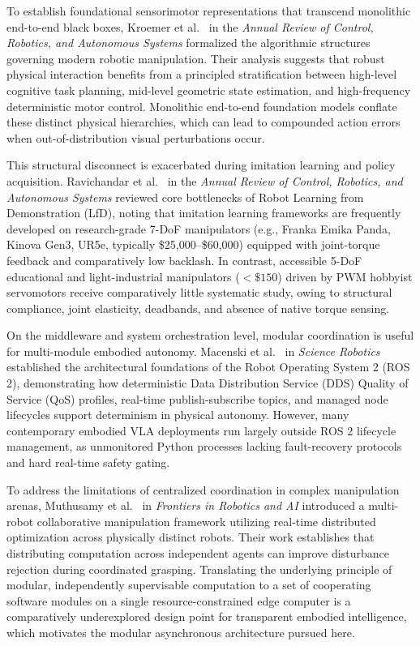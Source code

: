 \documentclass[journal]{IEEEtran}
\begin{document}
To establish foundational sensorimotor representations that transcend monolithic end-to-end black boxes, Kroemer et al.~\cite{kroemer2021review} in the \textit{Annual Review of Control, Robotics, and Autonomous Systems} formalized the algorithmic structures governing modern robotic manipulation. Their analysis suggests that robust physical interaction benefits from a principled stratification between high-level cognitive task planning, mid-level geometric state estimation, and high-frequency deterministic motor control. Monolithic end-to-end foundation models conflate these distinct physical hierarchies, which can lead to compounded action errors when out-of-distribution visual perturbations occur.

This structural disconnect is exacerbated during imitation learning and policy acquisition. Ravichandar et al.~\cite{aria_001_ravichandar_2020_recent} in the \textit{Annual Review of Control, Robotics, and Autonomous Systems} reviewed core bottlenecks of Robot Learning from Demonstration (LfD), noting that imitation learning frameworks are frequently developed on research-grade 7-DoF manipulators (e.g., Franka Emika Panda, Kinova Gen3, UR5e, typically \$25{,}000--\$60{,}000) equipped with joint-torque feedback and comparatively low backlash. In contrast, accessible 5-DoF educational and light-industrial manipulators ($<\$150$) driven by PWM hobbyist servomotors receive comparatively little systematic study, owing to structural compliance, joint elasticity, deadbands, and absence of native torque sensing.

On the middleware and system orchestration level, modular coordination is useful for multi-module embodied autonomy. Macenski et al.~\cite{aria_022_macenski_2022_robot} in \textit{Science Robotics} established the architectural foundations of the Robot Operating System 2 (ROS 2), demonstrating how deterministic Data Distribution Service (DDS) Quality of Service (QoS) profiles, real-time publish-subscribe topics, and managed node lifecycles support determinism in physical autonomy. However, many contemporary embodied VLA deployments run largely outside ROS 2 lifecycle management, as unmonitored Python processes lacking fault-recovery protocols and hard real-time safety gating.

To address the limitations of centralized coordination in complex manipulation arenas, Muthusamy et al.~\cite{aria_008_muthusamy_2025_a} in \textit{Frontiers in Robotics and AI} introduced a multi-robot collaborative manipulation framework utilizing real-time distributed optimization across physically distinct robots. Their work establishes that distributing computation across independent agents can improve disturbance rejection during coordinated grasping. Translating the underlying principle of modular, independently supervisable computation to a set of cooperating software modules on a single resource-constrained edge computer is a comparatively underexplored design point for transparent embodied intelligence, which motivates the modular asynchronous architecture pursued here.
\end{document}
